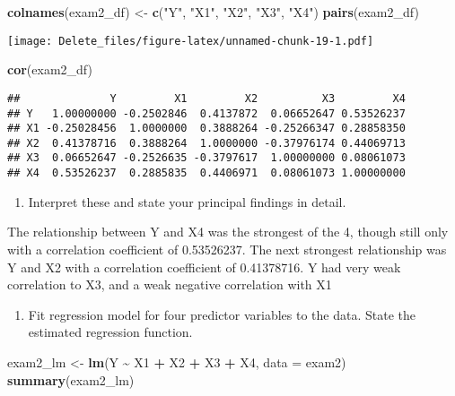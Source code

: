 \documentclass[
]{article}
\newenvironment{Shaded}{\begin{snugshade}}{\end{snugshade}}
\newcommand{\AttributeTok}[1]{\textcolor[rgb]{0.13,0.29,0.53}{#1}}
\newcommand{\FunctionTok}[1]{\textcolor[rgb]{0.13,0.29,0.53}{\textbf{#1}}}
\newcommand{\NormalTok}[1]{#1}
\newcommand{\OtherTok}[1]{\textcolor[rgb]{0.56,0.35,0.01}{#1}}
\newcommand{\SpecialCharTok}[1]{\textcolor[rgb]{0.81,0.36,0.00}{\textbf{#1}}}
\newcommand{\StringTok}[1]{\textcolor[rgb]{0.31,0.60,0.02}{#1}}
\providecommand{\tightlist}{%
  \setlength{\itemsep}{0pt}\setlength{\parskip}{0pt}}
\begin{document}
\begin{Shaded}
\begin{Highlighting}[]
\FunctionTok{colnames}\NormalTok{(exam2\_df) }\OtherTok{\textless{}{-}} \FunctionTok{c}\NormalTok{(}\StringTok{"Y"}\NormalTok{, }\StringTok{"X1"}\NormalTok{, }\StringTok{"X2"}\NormalTok{, }\StringTok{"X3"}\NormalTok{, }\StringTok{"X4"}\NormalTok{)}
\FunctionTok{pairs}\NormalTok{(exam2\_df)}
\end{Highlighting}
\end{Shaded}

\texttt{[image: Delete\_files/figure-latex/unnamed-chunk-19-1.pdf]}

\begin{Shaded}
\begin{Highlighting}[]
\FunctionTok{cor}\NormalTok{(exam2\_df)}
\end{Highlighting}
\end{Shaded}

\begin{verbatim}
##              Y         X1         X2          X3         X4
## Y   1.00000000 -0.2502846  0.4137872  0.06652647 0.53526237
## X1 -0.25028456  1.0000000  0.3888264 -0.25266347 0.28858350
## X2  0.41378716  0.3888264  1.0000000 -0.37976174 0.44069713
## X3  0.06652647 -0.2526635 -0.3797617  1.00000000 0.08061073
## X4  0.53526237  0.2885835  0.4406971  0.08061073 1.00000000
\end{verbatim}

\begin{enumerate}
\def\labelenumi{(\alph{enumi})}
\setcounter{enumi}{3}
\tightlist
\item
  Interpret these and state your principal findings in detail.
\end{enumerate}

The relationship between Y and X4 was the strongest of the 4, though
still only with a correlation coefficient of 0.53526237. The next
strongest relationship was Y and X2 with a correlation coefficient of
0.41378716. Y had very weak correlation to X3, and a weak negative
correlation with X1

\begin{enumerate}
\def\labelenumi{(\alph{enumi})}
\setcounter{enumi}{4}
\tightlist
\item
  Fit regression model for four predictor variables to the data. State
  the estimated regression function.
\end{enumerate}

\begin{Shaded}
\begin{Highlighting}[]
\NormalTok{exam2\_lm }\OtherTok{\textless{}{-}} \FunctionTok{lm}\NormalTok{(Y }\SpecialCharTok{\textasciitilde{}}\NormalTok{ X1 }\SpecialCharTok{+}\NormalTok{ X2 }\SpecialCharTok{+}\NormalTok{ X3 }\SpecialCharTok{+}\NormalTok{ X4, }\AttributeTok{data =}\NormalTok{ exam2)}
\FunctionTok{summary}\NormalTok{(exam2\_lm)}
\end{Highlighting}
\end{Shaded}
\end{document}

